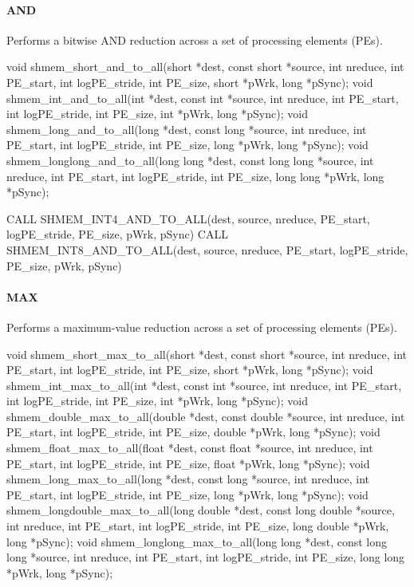 
\begin{apidefinition}

\paragraph{AND}
Performs a bitwise AND reduction across a set of processing elements (\acp{PE}).\newline
\begin{Csynopsis}
void shmem_short_and_to_all(short *dest, const short *source, int nreduce, int PE_start, int logPE_stride, int PE_size, short *pWrk, long *pSync);
void shmem_int_and_to_all(int *dest, const int *source, int nreduce, int PE_start, int logPE_stride, int PE_size, int *pWrk, long *pSync);
void shmem_long_and_to_all(long *dest, const long *source, int nreduce, int PE_start, int logPE_stride, int PE_size, long *pWrk, long *pSync);
void shmem_longlong_and_to_all(long long *dest, const long long *source, int nreduce, int PE_start, int logPE_stride, int PE_size, long long *pWrk, long *pSync);
\end{Csynopsis}

\begin{Fsynopsis}
CALL SHMEM_INT4_AND_TO_ALL(dest, source, nreduce, PE_start, logPE_stride, PE_size, pWrk, pSync)
CALL SHMEM_INT8_AND_TO_ALL(dest, source, nreduce, PE_start, logPE_stride, PE_size, pWrk, pSync)
\end{Fsynopsis}

\paragraph{MAX}
Performs a maximum-value reduction across a set of processing elements (\acp{PE}).\newline
\begin{Csynopsis}
void shmem_short_max_to_all(short *dest, const short *source, int nreduce, int PE_start, int logPE_stride, int PE_size, short *pWrk, long *pSync);
void shmem_int_max_to_all(int *dest, const int *source, int nreduce, int PE_start, int logPE_stride, int PE_size, int *pWrk, long *pSync);
void shmem_double_max_to_all(double *dest, const double *source, int nreduce, int PE_start, int logPE_stride, int PE_size, double *pWrk, long *pSync);
void shmem_float_max_to_all(float *dest, const float *source, int nreduce, int PE_start, int logPE_stride, int PE_size, float *pWrk, long *pSync);
void shmem_long_max_to_all(long *dest, const long *source, int nreduce, int PE_start, int logPE_stride, int PE_size, long *pWrk, long *pSync);
void shmem_longdouble_max_to_all(long double *dest, const long double *source, int nreduce, int PE_start, int logPE_stride, int PE_size, long double *pWrk, long *pSync);
void shmem_longlong_max_to_all(long long *dest, const long long *source, int nreduce, int PE_start, int logPE_stride, int PE_size, long long *pWrk, long *pSync);
\end{Csynopsis}


\end{apidefinition}
